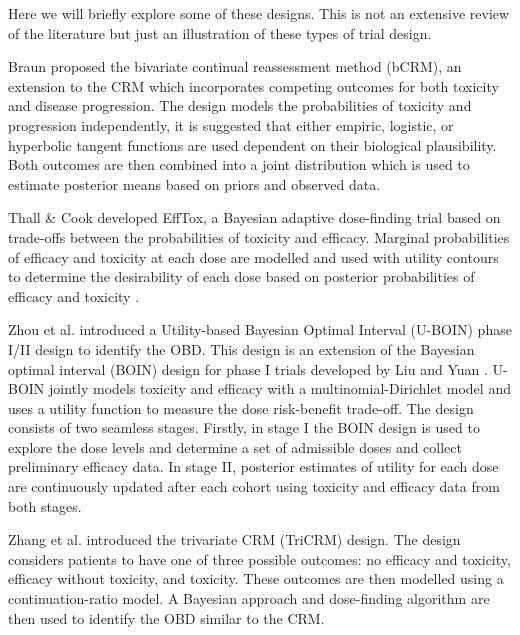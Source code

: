 Here we will briefly explore some of these designs. This is not an extensive review of the literature but just an illustration of these types of trial design. 

Braun \cite{braunBivariateContinualReassessment2002} proposed the bivariate continual reassessment method (bCRM), an extension to the CRM which incorporates competing outcomes for both toxicity and disease progression. The design models the probabilities of toxicity and progression independently, it is suggested that either empiric, logistic, or hyperbolic tangent functions are used dependent on their biological plausibility. Both outcomes are then combined into a joint distribution which is used to estimate posterior means based on priors and observed data. 

Thall \& Cook \cite{thallDosefindingBasedEfficacytoxicity2004} developed EffTox, a Bayesian adaptive dose-finding trial based on trade-offs between the probabilities of toxicity and efficacy. Marginal probabilities of efficacy and toxicity at each dose are modelled and used with utility contours to determine the desirability of each dose based on posterior probabilities of efficacy and toxicity \cite{brockImplementingEffToxDosefinding2017}. 

Zhou et al. \cite{zhouUtilitybasedBayesianOptimal2019} introduced a Utility-based Bayesian Optimal Interval (U-BOIN) phase \RN{1}/\RN{2} design to identify the OBD. This design is an extension of the Bayesian optimal interval (BOIN) design for phase \RN{1} trials developed by Liu and Yuan \cite{liuBAYESIANDATAAUGMENTATION2013}. U-BOIN jointly models toxicity and efficacy with a multinomial-Dirichlet model and uses a utility function to measure the dose risk-benefit trade-off. The design consists of two seamless stages. Firstly, in stage \RN{1} the BOIN design is used to explore the dose levels and determine a set of admissible doses and collect preliminary efficacy data. In stage \RN{2}, posterior estimates of utility for each dose are continuously updated after each cohort using toxicity and efficacy data from both stages. 

Zhang et al. \cite{zhangAdaptiveDosefindingDesign2006} introduced the trivariate CRM (TriCRM) design. The design considers patients to have one of three possible outcomes: no efficacy and toxicity, efficacy without toxicity, and toxicity. These outcomes are then modelled using a continuation-ratio model. A Bayesian approach and dose-finding algorithm are then used to identify the OBD similar to the CRM.  

